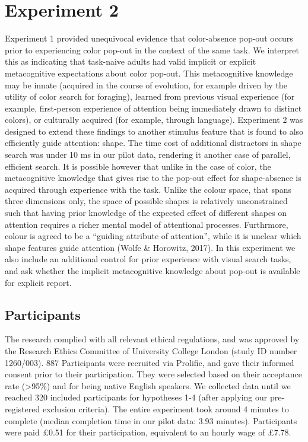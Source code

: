 \documentclass[
  english,
  man]{apa6}
\begin{document}
\hypertarget{experiment-2}{%
\section{Experiment 2}\label{experiment-2}}

Experiment 1 provided unequivocal evidence that color-absence pop-out occurs prior to experiencing color pop-out in the context of the same task. We interpret this as indicating that task-naive adults had valid implicit or explicit metacognitive expectations about color pop-out. This metacognitive knowledge may be innate (acquired in the course of evolution, for example driven by the utility of color search for foraging), learned from previous visual experience (for example, first-person experience of attention being immediately drawn to distinct colors), or culturally acquired (for example, through language). Experiment 2 was designed to extend these findings to another stimulus feature that is found to also efficiently guide attention: shape. The time cost of additional distractors in shape search was under 10 ms in our pilot data, rendering it another case of parallel, efficient search. It is possible however that unlike in the case of color, the metacognitive knowledge that gives rise to the pop-out effect for shape-absence is acquired through experience with the task. Unlike the colour space, that spans three dimensions only, the space of possible shapes is relatively unconstrained such that having prior knowledge of the expected effect of different shapes on attention requires a richer mental model of attentional processes. Furthrmore, colour is agreed to be a \enquote{guiding attribute of attention}, while it is unclear which shape features guide attention (Wolfe \& Horowitz, 2017). In this experiment we also include an additional control for prior experience with visual search tasks, and ask whether the implicit metacognitive knowledge about pop-out is available for explicit report.

\hypertarget{participants-1}{%
\subsection{Participants}\label{participants-1}}

The research complied with all relevant ethical regulations, and was approved by the Research Ethics Committee of University College London (study ID number 1260/003). 887 Participants were recruited via Prolific, and gave their informed consent prior to their participation. They were selected based on their acceptance rate (\textgreater95\%) and for being native English speakers. We collected data until we reached 320 included participants for hypotheses 1-4 (after applying our pre-registered exclusion criteria). The entire experiment took around 4 minutes to complete (median completion time in our pilot data: 3.93 minutes). Participants were paid £0.51 for their participation, equivalent to an hourly wage of £7.78.
\end{document}

